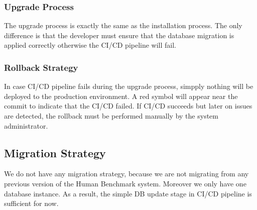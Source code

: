 
\subsubsection{Upgrade Process}

The upgrade process is exactly the same as the installation process.
The only difference is that the developer must ensure that the database migration
is applied correctly otherwise the CI/CD pipeline will fail.

\subsubsection{Rollback Strategy}

In case CI/CD pipeline fails during the upgrade process, simpply nothing will be
deployed to the production environment. A red symbol will appear near the commit
to indicate that the CI/CD failed. If CI/CD succeeds but later on issues are
detected, the rollback must be performed manually by the system administrator.


\subsection{Migration Strategy}
We do not have any migration strategy, because we are not migrating from any
previous version of the Human Benchmark system. Moreover we only have one
database instance. As a result, the simple DB update stage in CI/CD pipeline is
sufficient for now.


